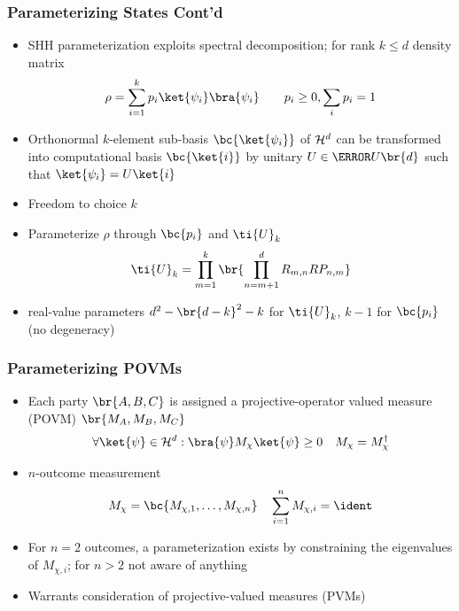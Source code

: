 \documentclass[
    hyperref={bookmarks=false},%
    xcolor={dvipsnames},
]{beamer}
\renewcommand{\term}[1]{\textcolor{Mahogany}{#1}}
\begin{document}
\begin{frame}
    \frametitle{Parameterizing States Cont'd}
    \begin{itemize}
        \item \term{SHH parameterization} \cite{Spengler_2010_Unitary} exploits spectral decomposition; for rank $k \leq d$ density matrix
        \[ \rho = \sum_{i=1}^{k} p_i \ket{\psi_i} \bra{\psi_i} \qquad p_i \geq 0, \sum_i p_i = 1 \]
        \item Orthonormal $k$-element sub-basis $\bc{\ket{\psi_i}}$ of $\mathcal{H}^d$ can be transformed into computational basis $\bc{\ket{i}}$ by unitary $U \in \s{U}\br{d}$ such that $\ket{\psi_i} = U \ket{i}$
        \item Freedom to choice $k$
        \item Parameterize $\rho$ through $\bc{p_i}$ and $\ti{U}_{k}$
        \[ \ti{U}_{k} = \prod_{m=1}^{k} \br{\prod_{n={m+1}}^{d} R_{m,n} RP_{n,m}} \]
        \item real-value parameters $d^2 - \br{d-k}^2 - k$ for $\ti{U}_{k}$, $k-1$ for $\bc{p_i}$ (no degeneracy)
    \end{itemize}
\end{frame}

\begin{frame}
    \frametitle{Parameterizing POVMs}
    \begin{itemize}
        \item Each party $\br{A, B, C}$ is assigned a \term{projective-operator valued measure (POVM)} $\br{M_A, M_B, M_C}$
        \[ \forall \ket{\psi} \in \Hilb^d : \bra{\psi} M_\chi \ket{\psi} \geq 0 \quad M_\chi = M_\chi^{\dagger} \]
        \item $n$-outcome measurement
        \[ M_\chi = \bc{M_{\chi, 1}, \ldots, M_{\chi, n}} \quad \sum_{i=1}^{n} M_{\chi, i} = \ident \]
        \item For $n = 2$ outcomes, a parameterization exists by constraining the eigenvalues of $M_{\chi, i}$; for $n > 2$ not aware of anything
        \item Warrants consideration of \term{projective-valued measures (PVMs)}
    \end{itemize}
\end{frame}
\end{document}
